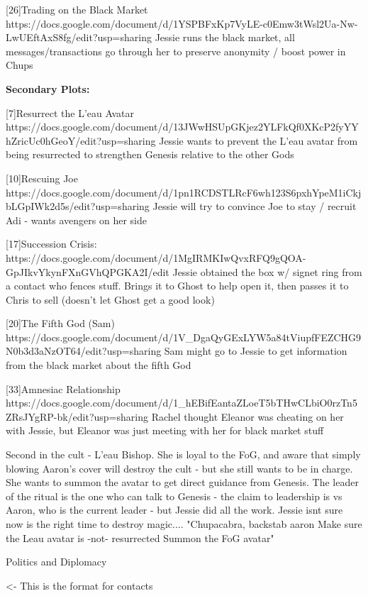 \documentclass[char]{GL2020}
\begin{document}
[26]Trading on the Black Market https://docs.google.com/document/d/1YSPBFxKp7VyLE-c0Emw3tWsl2Ua-Nw-LwUEftAxS8fg/edit?usp=sharing
Jessie runs the black market, all messages/transactions go through her to preserve anonymity / boost power in Chups

\textbf{Secondary Plots:}

[7]Resurrect the L'eau Avatar https://docs.google.com/document/d/13JWwHSUpGKjez2YLFkQf0XKcP2fyYYhZricUc0hGeoY/edit?usp=sharing
Jessie wants to prevent the L'eau avatar from being resurrected to strengthen Genesis relative to the other Gods

[10]Rescuing Joe https://docs.google.com/document/d/1pn1RCDSTLRcF6wh123S6pxhYpeM1iCkjbLGpIWk2d5s/edit?usp=sharing
Jessie will try to convince Joe to stay / recruit Adi - wants avengers on her side

[17]Succession Crisis: https://docs.google.com/document/d/1MgIRMKIwQvxRFQ9gQOA-GpJIkvYkynFXnGVhQPGKA2I/edit
Jessie obtained the box w/ signet ring from a contact who fences stuff.  Brings it to Ghost to help open it, then passes it to Chris to sell (doesn't let Ghost get a good look)

[20]The Fifth God (Sam) https://docs.google.com/document/d/1V_DgaQyGExLYW5a84tViupfFEZCHG9N0b3d3aNzOT64/edit?usp=sharing
Sam might go to Jessie to get information from the black market about the fifth God

[33]Amnesiac Relationship https://docs.google.com/document/d/1_hEBifEantaZLoeT5bTHwCLbiO0rzTn5ZRsJYgRP-bk/edit?usp=sharing
Rachel thought Eleanor was cheating on her with Jessie, but Eleanor was just meeting with her for black market stuff


Second in the cult - L'eau Bishop. She is loyal to the FoG, and aware that simply blowing Aaron's cover will destroy the cult - but she still wants to be in charge. She wants to summon the avatar to get direct guidance from Genesis. The leader of the ritual is the one who can talk to Genesis - the claim to leadership is vs Aaron, who is the current leader - but Jessie did all the work. Jessie isnt sure now is the right time to destroy magic....		"Chupacabra, backstab aaron
Make sure the Leau avatar is -not- resurrected
Summon the FoG avatar"	

Politics and Diplomacy

\begin{itemz}[Goals]
	\item 
\end{itemz}

\begin{itemz}[Notes]
	\item 
\end{itemz}

\begin{contacts}
	\contact{\cTest{}} <- This is the format for contacts 
\end{contacts}
\end{document}
